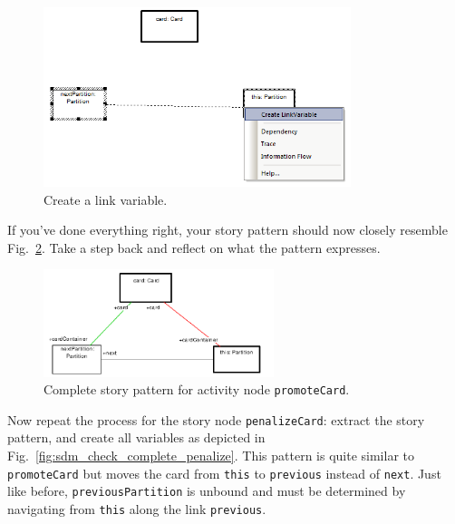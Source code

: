 \begin{figure}[htbp]
\begin{center}
  \includegraphics[width=0.8\textwidth]{pics/sdmBilder/check/sdm26}
  \caption{Create a link variable.}  
  \label{fig:sdm_check_link_variable}
\end{center}
\end{figure}

If you've done everything right, your story pattern should now closely resemble
Fig.~\ref{fig:sdm_check_complete_activity_node}.  Take a step back and reflect
on what the pattern expresses.

\begin{figure}[htbp] 
\begin{center}
  \includegraphics[width=0.6\textwidth]{pics/sdmBilder/check/sdm30}
  \caption{Complete story pattern for activity node \texttt{promoteCard}.}  
  \label{fig:sdm_check_complete_activity_node}
\end{center}
\end{figure}

Now repeat the process for the story node \texttt{penalizeCard}: extract the
story pattern, and create all variables as depicted in
Fig.~\ref{fig:sdm_check_complete_penalize}.  This pattern is quite similar to
\texttt{promoteCard} but moves the card from \texttt{this} to \texttt{previous}
instead of \texttt{next}.  Just like before, \texttt{previousPartition} is
unbound and must be determined by navigating from \texttt{this} along the link
\texttt{previous}.

